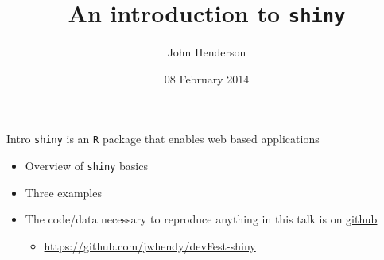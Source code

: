 \documentclass[sans,aspectratio=169,presentation,bigger,fleqn]{beamer}
\author{John Henderson}
\date{08 February 2014}
\title{An introduction to \texttt{shiny}}
\begin{document}
\maketitle

\begin{frame}[fragile,label=sec-1]{Intro}
 \texttt{shiny} is an \texttt{R} package that enables web based applications
\begin{itemize}
\item Overview of \texttt{shiny} basics
\item Three examples
\item The code/data necessary to reproduce anything in this talk is on \href{https://github.com/jwhendy/devFest-shiny}{github}
\begin{itemize}
\item \url{https://github.com/jwhendy/devFest-shiny}
\end{itemize}
\end{itemize}
\end{frame}
\end{document}

